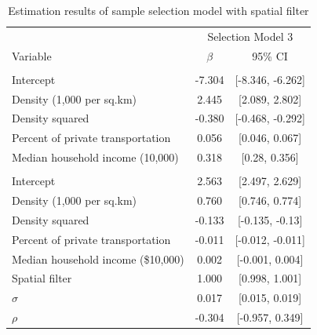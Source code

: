 \documentclass[]{elsarticle} %
\begin{document}
\begin{table}[!h]

\caption{\label{tab:tabulate-sample-selection3-results}\label{tab:selection3-results}Estimation results of sample selection model with spatial filter}
\centering
\fontsize{8}{10}\selectfont
\begin{tabular}[t]{lcc}
\toprule
\multicolumn{1}{c}{ } & \multicolumn{2}{c}{Selection Model 3} \\
\cmidrule(l{3pt}r{3pt}){2-3}
Variable & $\beta$ & 95\% CI\\
\midrule
\addlinespace[0.3em]
\multicolumn{3}{l}{\textbf{Sample Selection Model}}\\
\hspace{1em}Intercept & -7.304 & [-8.346, -6.262]\\
\hspace{1em}Density (1,000 per sq.km) & 2.445 & [2.089, 2.802]\\
\hspace{1em}Density squared & -0.380 & [-0.468, -0.292]\\
\hspace{1em}Percent of private transportation & 0.056 & [0.046, 0.067]\\
\hspace{1em}Median household income (10,000) & 0.318 & [0.28, 0.356]\\
\addlinespace[0.3em]
\multicolumn{3}{l}{\textbf{Outcome Model}}\\
\hspace{1em}Intercept & 2.563 & [2.497, 2.629]\\
\hspace{1em}Density (1,000 per sq.km) & 0.760 & [0.746, 0.774]\\
\hspace{1em}Density squared & -0.133 & [-0.135, -0.13]\\
\hspace{1em}Percent of private transportation & -0.011 & [-0.012, -0.011]\\
\hspace{1em}Median household income (\$10,000) & 0.002 & [-0.001, 0.004]\\
\hspace{1em}Spatial filter & 1.000 & [0.998, 1.001]\\
$\sigma$ & 0.017 & [0.015, 0.019]\\
$\rho$ & -0.304 & [-0.957, 0.349]\\
\bottomrule
\end{tabular}
\end{table}
\end{document}
